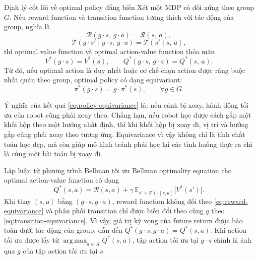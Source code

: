 \begin{infobox}{Định lý cốt lõi về optimal policy đẳng biến}
Xét một MDP có đối xứng theo group $G$. Nếu reward function và transition function tương thích với tác động của group, nghĩa là
\begin{equation}
    \mathcal{R}(g \cdot s,\, g \cdot a) = \mathcal{R}(s,\,a),
    \label{eq:reward-equivariance}
\end{equation}
\begin{equation}
    \mathcal{T}(g \cdot s' \mid g \cdot s,\, g \cdot a)
    =
    \mathcal{T}(s' \mid s,\,a),
    \label{eq:transition-equivariance}
\end{equation}
thì optimal value function và optimal action-value function thỏa mãn
\begin{equation}
    V^*(g \cdot s) = V^*(s),
    \qquad
    Q^*(g \cdot s,\, g \cdot a) = Q^*(s,\,a).
    \label{eq:value-invariance}
\end{equation}
Từ đó, nếu optimal action là duy nhất hoặc cơ chế chọn action được ràng buộc nhất quán theo group, optimal policy có dạng equivariant:
\begin{equation}
    \pi^*(g \cdot s) = g \cdot \pi^*(s),
    \qquad \forall g \in G.
    \label{eq:policy-equivariance}
\end{equation}
\end{infobox}

Ý nghĩa của kết quả \eqref{eq:policy-equivariance} là: nếu cảnh bị xoay, hành động tối ưu của robot cũng phải xoay theo. Chẳng hạn, nếu robot học được cách gắp một khối hộp theo một hướng nhất định, thì khi khối hộp bị xoay đi, vị trí và hướng gắp cũng phải xoay theo tương ứng. Equivariance vì vậy không chỉ là tính chất toán học đẹp, mà còn giúp mô hình tránh phải học lại các tình huống thực ra chỉ là cùng một bài toán bị xoay đi.

\begin{notebox}{Lập luận từ phương trình Bellman tối ưu}
Bellman optimality equation cho optimal action-value function có dạng
\begin{equation}
    Q^*(s,a)
    =
    \mathcal{R}(s,a)
    +
    \gamma\,
    \mathbb{E}_{s' \sim \mathcal{T}(\cdot \mid s,a)}
    \bigl[
        V^*(s')
    \bigr].
    \label{eq:bellman}
\end{equation}
Khi thay $(s,a)$ bằng $(g \cdot s, g \cdot a)$, reward function không đổi theo \eqref{eq:reward-equivariance} và phân phối transition chỉ được biến đổi theo cùng $g$ theo \eqref{eq:transition-equivariance}. Vì vậy, giá trị kỳ vọng của future return được bảo toàn dưới tác động của group, dẫn đến $Q^*(g \cdot s, g \cdot a)=Q^*(s,a)$. Khi action tối ưu được lấy từ $\operatorname*{arg\,max}_{a \in \mathcal{A}} Q^*(s,a)$, tập action tối ưu tại $g \cdot s$ chính là ảnh qua $g$ của tập action tối ưu tại $s$.
\end{notebox}

